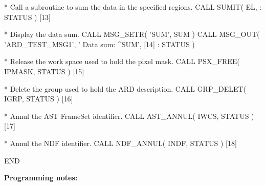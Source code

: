 \documentclass[11pt]{starlink}
\begin{document}
\begin{terminalv}
*  Call a subroutine to sum the data in the specified regions.
      CALL SUMIT( EL, %
     :            STATUS )                                      [13]

*  Display the data sum.
      CALL MSG_SETR( 'SUM', SUM )
      CALL MSG_OUT( 'ARD_TEST_MSG1', '  Data sum: ^SUM',        [14]
     :               STATUS )

*  Release the work space used to hold the pixel mask.
      CALL PSX_FREE( IPMASK, STATUS )                           [15]

*  Delete the group used to hold the ARD description.
      CALL GRP_DELET( IGRP, STATUS )                            [16]

*  Annul the AST FrameSet identifier.
      CALL AST_ANNUL( IWCS, STATUS )                            [17]

*  Annul the NDF identifier.
      CALL NDF_ANNUL( INDF, STATUS )                            [18]

      END
\end{terminalv}
\normalsize

\textbf{Programming notes:}
\end{document}
